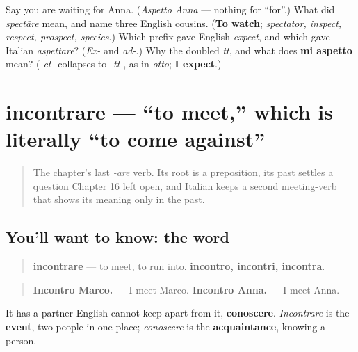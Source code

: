 \begin{tcolorbox}[breakable,colback=teal!4,colframe=teal!35!black,title={Before you move on}]
Say you are waiting for Anna. (\emph{Aspetto Anna} — nothing for \textquotedblleft{}for\textquotedblright{}.) What did \emph{spectāre} mean, and name three English cousins. (\textbf{To watch}; \emph{spectator, inspect, respect, prospect, species}.) Which prefix gave English \emph{expect}, and which gave Italian \emph{aspettare}? (\emph{Ex-} and \emph{ad-}.) Why the doubled \emph{tt}, and what does \textbf{mi aspetto} mean? (\emph{-ct-} collapses to \emph{-tt-}, as in \emph{otto}; \textbf{I expect}.)
\end{tcolorbox}
\section[incontrare]{incontrare — \textquotedblleft{}to meet,\textquotedblright{} which is literally \textquotedblleft{}to come against\textquotedblright{}}

\label{lesson:IT-C20-incontrare}



\begin{quote}
The chapter's last \emph{-are} verb. Its root is a preposition, its past settles a question Chapter 16 left open, and Italian keeps a second meeting-verb that shows its meaning only in the past.
\end{quote}

\subsection*{You'll want to know: the word}
\begin{quote}
\textbf{incontrare} — to meet, to run into. \textbf{incontro, incontri, incontra}.
\end{quote}

\begin{quote}
\textbf{Incontro Marco.} — I meet Marco. \textbf{Incontro Anna.} — I meet Anna.
\end{quote}

It has a partner English cannot keep apart from it, \textbf{conoscere}. \emph{Incontrare} is the \textbf{event}, two people in one place; \emph{conoscere} is the \textbf{acquaintance}, knowing a person.

